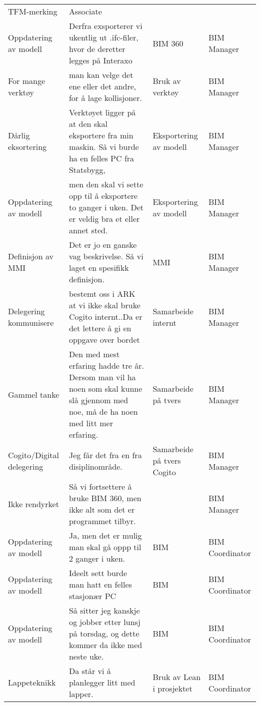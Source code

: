 \begin{landscape}
\begin{longtable}{p{0.25\textheight}p{0.5\textheight}p{0.25\textheight}p{0.25\textheight}}
      TFM-merking &
      Associate \\
    Oppdatering av modell &
      Derfra exsporterer vi ukentlig ut .ifc-filer, hvor de deretter legges på Interaxo &
      BIM 360 &
      BIM Manager \\
    For mange verktøy &
      man kan velge det ene eller det andre, for å lage kollisjoner. &
      Bruk av verktøy &
      BIM Manager \\
    Dårlig eksortering &
      Verktøyet ligger på at den skal eksportere fra min maskin. Så vi burde ha en felles PC fra Statsbygg, &
      Eksportering av modell &
      BIM Manager \\
    Oppdatering av modell &
      men den skal vi sette opp til å eksportere to ganger i uken. Det er veldig bra et eller annet sted. &
      Eksportering av modell &
      BIM Manager \\
    Definisjon av MMI &
      Det er jo en ganske vag beskrivelse. Så vi laget en spesifikk definisjon. &
      MMI &
      BIM Manager \\
    Delegering kommunisere &
      bestemt oss i ARK at vi ikke skal bruke Cogito internt..Da er det lettere å gi en oppgave over bordet &
      Samarbeide internt &
      BIM Manager \\
    Gammel tanke &
      Den med mest erfaring hadde tre år. Dersom man vil ha noen som skal kunne slå gjennom med noe, må de ha noen med litt mer erfaring. &
      Samarbeide på tvers &
      BIM Manager \\
    Cogito/Digital delegering &
      Jeg får det fra en fra disiplinområde. &
      Samarbeide på tvers Cogito &
      BIM Manager \\
    Ikke rendyrket &
      Så vi fortsettere å bruke BIM 360, men ikke alt som det er programmet tilbyr. &
       &
      BIM Manager \\
    Oppdatering av modell &
      Ja, men det er mulig man skal gå oppp til 2 ganger i uken. &
      BIM &
      BIM Coordinator \\
    Oppdatering av modell &
      Ideelt sett burde man hatt en felles stasjonær PC &
      BIM &
      BIM Coordinator \\
    Oppdatering av modell &
      Så sitter jeg kanskje og jobber etter lunsj på torsdag, og dette kommer da ikke med neste uke. &
      BIM &
      BIM Coordinator \\
    Lappeteknikk &
      Da står vi å planlegger litt med lapper. &
      Bruk av Lean i prosjektet &
      BIM Coordinator \\

\end{longtable}
\end{landscape}
